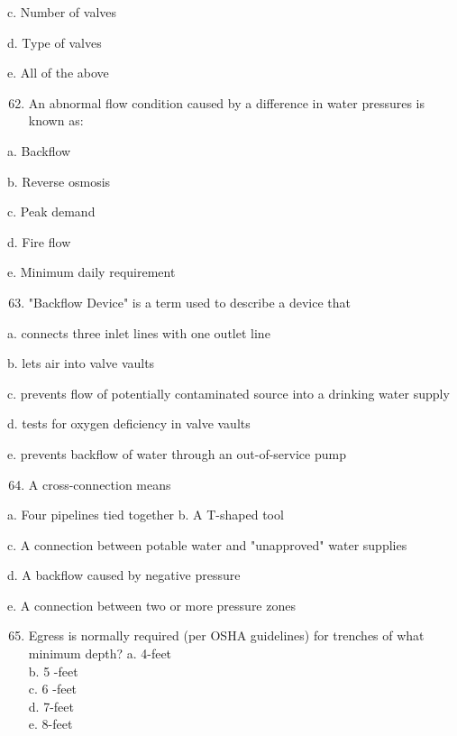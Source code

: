 \documentclass[10pt]{article}
\begin{document}
\begin{enumerate}
\begin{enumerate}
c. Number of valves

d. Type of valves

e. All of the above

\begin{enumerate}
  \setcounter{enumi}{61}
  \item An abnormal flow condition caused by a difference in water pressures is known as:
\end{enumerate}

a. Backflow

b. Reverse osmosis

c. Peak demand

d. Fire flow

e. Minimum daily requirement

\begin{enumerate}
  \setcounter{enumi}{62}
  \item "Backflow Device" is a term used to describe a device that
\end{enumerate}

a. connects three inlet lines with one outlet line

b. lets air into valve vaults

c. prevents flow of potentially contaminated source into a drinking water supply

d. tests for oxygen deficiency in valve vaults

e. prevents backflow of water through an out-of-service pump

\begin{enumerate}
  \setcounter{enumi}{63}
  \item A cross-connection means
\end{enumerate}

a. Four pipelines tied together b. A T-shaped tool

c. A connection between potable water and "unapproved" water supplies

d. A backflow caused by negative pressure

e. A connection between two or more pressure zones

\begin{enumerate}
  \setcounter{enumi}{64}
  \item Egress is normally required (per OSHA guidelines) for trenches of what minimum depth?
a. 4-feet\\
b. 5 -feet\\
c. 6 -feet\\
d. 7-feet\\
e. 8-feet


\end{enumerate}
\end{enumerate}
\end{enumerate}
\end{document}
